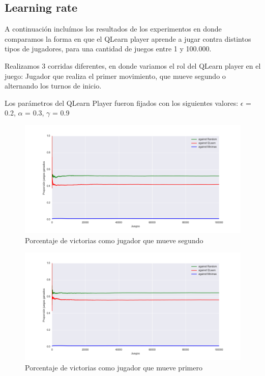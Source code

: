 \subsection{Learning rate}

A continuación incluímos los resultados de los experimentos en donde comparamos la forma en que el
QLearn player aprende a jugar contra distintos tipos de jugadores, para una cantidad de juegos entre
1 y 100.000.

Realizamos 3 corridas diferentes, en donde variamos el rol del QLearn player en el juego: Jugador
que realiza el primer movimiento, que mueve segundo o alternando los turnos de inicio.

Los parámetros del QLearn Player fueron fijados con los siguientes valores:
$\epsilon$ = 0.2, $\alpha$ = 0.3, $\gamma$ = 0.9

\begin{figure}
	\centerline{\includegraphics[width=1.3\textwidth]{imagenes-mata/learning_rate_as_second_player.png}}
	\caption{Porcentaje de victorias como jugador que mueve segundo}
\end{figure}

\begin{figure}
	\centerline{\includegraphics[width=1.3\textwidth]{imagenes-mata/learning_rate_as_first_player.png}}
	\caption{Porcentaje de victorias como jugador que mueve primero}
\end{figure}

